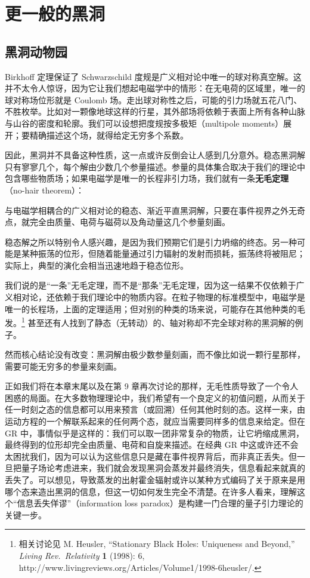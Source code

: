 
\chapter{更一般的黑洞}

\section{黑洞动物园}

Birkhoff 定理保证了 Schwarzschild 度规是广义相对论中唯一的球对称真空解。这并不太令人惊讶，因为它让我们想起电磁学中的情形：在无电荷的区域里，唯一的球对称场位形就是 Coulomb 场。走出球对称性之后，可能的引力场就五花八门、不胜枚举。比如对一颗像地球这样的行星，其外部场将依赖于表面上所有各种山脉与山谷的密度和轮廓。我们可以设想把度规按多极矩（multipole moments）展开；要精确描述这个场，就得给定无穷多个系数。

因此，黑洞并不具备这种性质，这一点或许反倒会让人感到几分意外。稳态黑洞解只有寥寥几个，每个解由少数几个参量描述。参量的具体集合取决于我们的理论中包含哪些物质场；如果电磁学是唯一的长程非引力场，我们就有一条\textbf{无毛定理}（no-hair theorem）：

与电磁学相耦合的广义相对论的稳态、渐近平直黑洞解，只要在事件视界之外无奇点，就完全由质量、电荷与磁荷以及角动量这几个参量刻画。

稳态解之所以特别令人感兴趣，是因为我们预期它们是引力坍缩的终态。另一种可能是某种振荡的位形，但随着能量通过引力辐射的发射而损耗，振荡终将被阻尼；实际上，典型的演化会相当迅速地趋于稳态位形。

我们说的是“一条”无毛定理，而不是“那条”无毛定理，因为这一结果不仅依赖于广义相对论，还依赖于我们理论中的物质内容。在粒子物理的标准模型中，电磁学是唯一的长程场，上面的定理适用；但对别的种类的场来说，可能存在其他种类的毛发。\footnote{相关讨论见 M. Heusler, “Stationary Black Holes: Uniqueness and Beyond,” \emph{Living Rev.\ Relativity} \textbf{1} (1998): 6, http://www.livingreviews.org/Articles/Volume1/1998-6heusler/.} 甚至还有人找到了静态（无转动）的、轴对称却不完全球对称的黑洞解的例子。

然而核心结论没有改变：黑洞解由极少数参量刻画，而不像比如说一颗行星那样，需要可能无穷多的参量来刻画。

正如我们将在本章末尾以及在第 9 章再次讨论的那样，无毛性质导致了一个令人困惑的局面。在大多数物理理论中，我们希望有一个良定义的初值问题，从而关于任一时刻之态的信息都可以用来预言（或回溯）任何其他时刻的态。这样一来，由运动方程的一个解联系起来的任何两个态，就应当需要同样多的信息来给定。但在 GR 中，事情似乎是这样的：我们可以取一团非常复杂的物质，让它坍缩成黑洞，最终得到的位形却完全由质量、电荷和自旋来描述。在经典 GR 中这或许还不会太困扰我们，因为可以认为这些信息只是藏在事件视界背后，而非真正丢失。但一旦把量子场论考虑进来，我们就会发现黑洞会蒸发并最终消失，信息看起来就真的丢失了。可以想见，导致蒸发的出射霍金辐射或许以某种方式编码了关于原来是用哪个态来造出黑洞的信息，但这一切如何发生完全不清楚。在许多人看来，理解这个“信息丢失佯谬”（information loss paradox）是构建一门合理的量子引力理论的关键一步。

